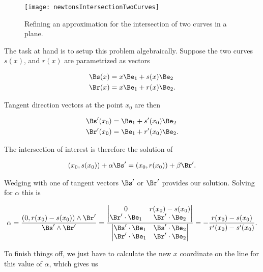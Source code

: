 \begin{figure}[htp]
\centering
\texttt{[image: newtonsIntersectionTwoCurves]}
\caption{Refining an approximation for the intersection of two curves in a plane.}\label{fig:newtonsIntersectionTwoCurves}
\end{figure}

The task at hand is to setup this problem algebraically.  Suppose the two curves $s(x)$, and $r(x)$ are parametrized as vectors

\begin{align}\label{eqn:intersectionNewton:40}
\Bs(x) &= x \Be_1 + s(x) \Be_2 \\
\Br(x) &= x \Be_1 + r(x) \Be_2.
\end{align}

Tangent direction vectors at the point $x_0$ are then

\begin{align}\label{eqn:intersectionNewton:41}
\Bs'(x_0) &= \Be_1 + s'(x_0) \Be_2 \\
\Br'(x_0) &= \Be_1 + r'(x_0) \Be_2.
\end{align}

The intersection of interest is therefore the solution of

\begin{align}\label{eqn:intersectionNewton:42}
(x_0, s(x_0)) + \alpha \Bs' = (x_0, r(x_0)) + \beta \Br'.
\end{align}

Wedging with one of tangent vectors $\Bs'$ or $\Br'$ provides our solution.  Solving for $\alpha$ this is

\begin{align}\label{eqn:intersectionNewton:43}
\alpha = \frac{(0, r(x_0) - s(x_0)) \wedge \Br'}{\Bs' \wedge \Br'} 
= 
\frac
{
\begin{vmatrix}
0 & r(x_0) - s(x_0) \\
\Br' \cdot \Be_1 & \Br' \cdot \Be_2 
\end{vmatrix}
}
{
\begin{vmatrix}
\Bs' \cdot \Be_1 & \Bs' \cdot \Be_2 \\
\Br' \cdot \Be_1 & \Br' \cdot \Be_2 
\end{vmatrix}
}
= 
-
\frac
{
r(x_0) - s(x_0)
}
{
r'(x_0) - s'(x_0) 
}.
\end{align}

To finish things off, we just have to calculate the new $x$ coordinate on the line for this value of $\alpha$, which gives us

